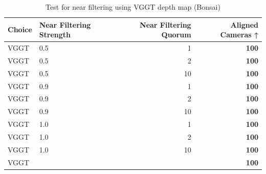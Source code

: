 \begin{table}[H]
\caption{Test for near filtering using VGGT depth map (Bonsai)}
\label{tab:99_near_filtering_gt_cams_bonsai}
\begin{tabular}{llrr}
\toprule
Choice & Near Filtering Strength & Near Filtering Quorum & Aligned Cameras ↑ \\
\midrule
VGGT & 0.5 & 1 & \textbf{100} \\
VGGT & 0.5 & 2 & \textbf{100} \\
VGGT & 0.5 & 10 & \textbf{100} \\
VGGT & 0.9 & 1 & \textbf{100} \\
VGGT & 0.9 & 2 & \textbf{100} \\
VGGT & 0.9 & 10 & \textbf{100} \\
VGGT & 1.0 & 1 & \textbf{100} \\
VGGT & 1.0 & 2 & \textbf{100} \\
VGGT & 1.0 & 10 & \textbf{100} \\
VGGT &  &  & \textbf{100} \\
\bottomrule
\end{tabular}
\end{table}
